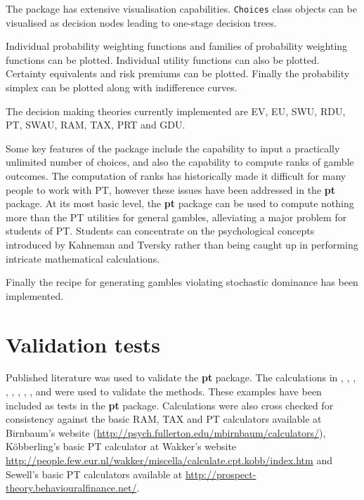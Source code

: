 \documentclass{article}\usepackage[]{graphicx}\usepackage[]{color}
\begin{document}
The package has extensive visualisation capabilities. {\tt Choices} class objects can be visualised as decision nodes leading to one-stage decision trees.

Individual probability weighting functions and families of probability weighting functions can be plotted. Individual utility functions can also be plotted. Certainty equivalents and risk premiums can be plotted. Finally the
probability simplex can be plotted along with indifference curves.

The decision making theories currently implemented are EV, EU, SWU, RDU, PT, SWAU, RAM, TAX, PRT and GDU.

Some key features of the package include the capability to input a practically unlimited number of choices, and also the
capability to compute ranks of gamble outcomes. The computation of ranks has historically made it difficult
for many people to work with PT, however these issues have been addressed in the {\bf pt} package. At its most basic level,
the {\bf pt} package can be used to compute nothing more than the PT utilities for general gambles, alleviating a major problem for
students of PT. Students can concentrate on the psychological concepts introduced by Kahneman and Tversky rather than being caught up in performing intricate mathematical calculations.

Finally the \cite{Birnbaum_1997} recipe for generating gambles violating stochastic dominance has been implemented.

\section{Validation tests}

Published literature was used to validate the {\bf pt} package. The calculations in \cite{Birnbaum_1999}, \cite{Birnbaum_Patton_Lott_1999}, \cite{Wakker_2003}, \cite{Birnbaum_2005a}, \cite{Birnbaum_2007}, \cite{Birnbaum_Bahra_2007}, \cite{Birnbaum_2008}, \cite{Birnbaum_Schmidt_2008}, \cite{Birnbaum_2010} and \cite{Wakker_2010} were used to validate the methods. These examples have been included as tests in the {\bf pt} package. Calculations were also cross checked for consistency against the basic RAM, TAX and PT calculators available at
Birnbaum's website (\url{http://psych.fullerton.edu/mbirnbaum/calculators/}), 
K\"{o}bberling's basic PT calculator at Wakker's website \url{http://people.few.eur.nl/wakker/miscella/calculate.cpt.kobb/index.htm} and Sewell's basic PT calculators available at \url{http://prospect-theory.behaviouralfinance.net/}.
\end{document}
